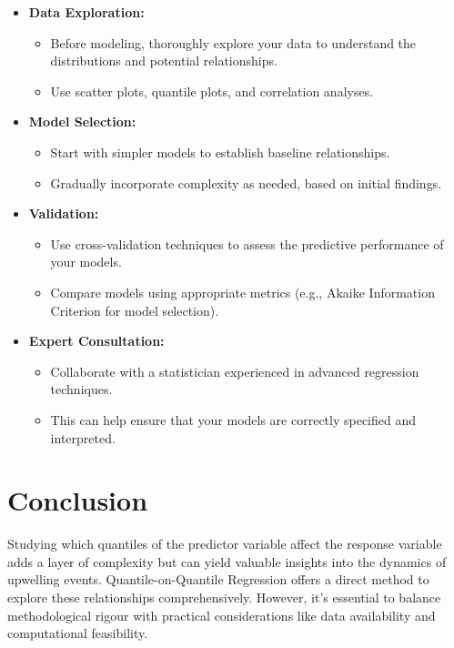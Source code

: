 \documentclass[
  letterpaper,
]{book}
\providecommand{\tightlist}{%
  \setlength{\itemsep}{0pt}\setlength{\parskip}{0pt}}\usepackage{longtable,booktabs,array}
\begin{document}
\begin{itemize}
\tightlist
\item
  \textbf{Data Exploration:}

  \begin{itemize}
  \tightlist
  \item
    Before modeling, thoroughly explore your data to understand the
    distributions and potential relationships.
  \item
    Use scatter plots, quantile plots, and correlation analyses.
  \end{itemize}
\item
  \textbf{Model Selection:}

  \begin{itemize}
  \tightlist
  \item
    Start with simpler models to establish baseline relationships.
  \item
    Gradually incorporate complexity as needed, based on initial
    findings.
  \end{itemize}
\item
  \textbf{Validation:}

  \begin{itemize}
  \tightlist
  \item
    Use cross-validation techniques to assess the predictive performance
    of your models.
  \item
    Compare models using appropriate metrics (e.g., Akaike Information
    Criterion for model selection).
  \end{itemize}
\item
  \textbf{Expert Consultation:}

  \begin{itemize}
  \tightlist
  \item
    Collaborate with a statistician experienced in advanced regression
    techniques.
  \item
    This can help ensure that your models are correctly specified and
    interpreted.
  \end{itemize}
\end{itemize}

\section{Conclusion}\label{conclusion}

Studying which quantiles of the predictor variable affect the response
variable adds a layer of complexity but can yield valuable insights into
the dynamics of upwelling events. Quantile-on-Quantile Regression offers
a direct method to explore these relationships comprehensively. However,
it's essential to balance methodological rigour with practical
considerations like data availability and computational feasibility.
\end{document}
